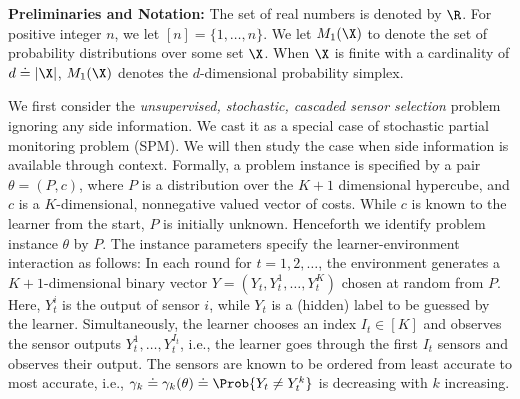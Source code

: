 \newcommand{\ind}[1]{\mathbb{I}\{#1\}}
%
\vspace{-5pt}
\noindent
{\bf Preliminaries and Notation:} 
The set of real numbers is denoted by $\R$. For positive integer $n$, we let
$[n] = \{1,\dots,n\}$. %
We let $M_1(\X)$ to denote the set of probability distributions over some set $\X$.
When $\X$ is finite with a cardinality of $d \doteq |\X|$, 
$M_1(\X)$ denotes the $d$-dimensional probability simplex.

We first consider the {\it unsupervised, stochastic, 
cascaded sensor selection} problem ignoring any side information. We cast it as a special case of stochastic partial monitoring problem (SPM).
We will then study the case when side information is available through context. %
Formally, 
a problem instance is specified by a pair $\theta = (P,c)$, where $P$ is
a distribution over the $K+1$ dimensional hypercube, and $c$ is a $K$-dimensional, nonnegative valued vector
of costs.
While $c$ is known to the learner from the start, $P$ is initially unknown. Henceforth we identify problem instance $\theta$ by $P$. 
The instance parameters specify the learner-environment interaction as follows:
In each round for $t=1,2,\dots$, 
the environment generates a $K+1$-dimensional binary vector
$Y = (Y_t,Y_t^1,\dots,Y_t^K)$ chosen at random from $P$.
Here, $Y_t^i$ is the output of sensor $i$, while $Y_t$ is a (hidden) label to be guessed by the learner.
Simultaneously, the learner chooses an index $I_t\in [K]$ and observes the sensor outputs $Y_t^1,\dots,Y_t^{I_t}$, i.e., the learner goes through the first $I_t$ sensors and observes their output.
The sensors are known to be ordered from least accurate to most accurate, 
i.e., $\gamma_k\doteq\gamma_k(\theta) \doteq \Prob{Y_t\ne Y_t^k}$ is decreasing with $k$ increasing.
